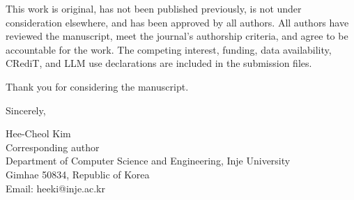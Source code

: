 \documentclass[10pt]{article}
\begin{document}
This work is original, has not been published previously, is not under
consideration elsewhere, and has been approved by all authors. All authors have
reviewed the manuscript, meet the journal's authorship criteria, and agree to be
accountable for the work. The competing interest, funding, data availability,
CRediT, and LLM use declarations are included in the submission files.

Thank you for considering the manuscript.

Sincerely,

{Hee-Cheol Kim}\\
{Corresponding author}\\
{Department of Computer Science and Engineering, Inje University}\\
{Gimhae 50834, Republic of Korea}\\
Email: heeki@inje.ac.kr
\end{document}

